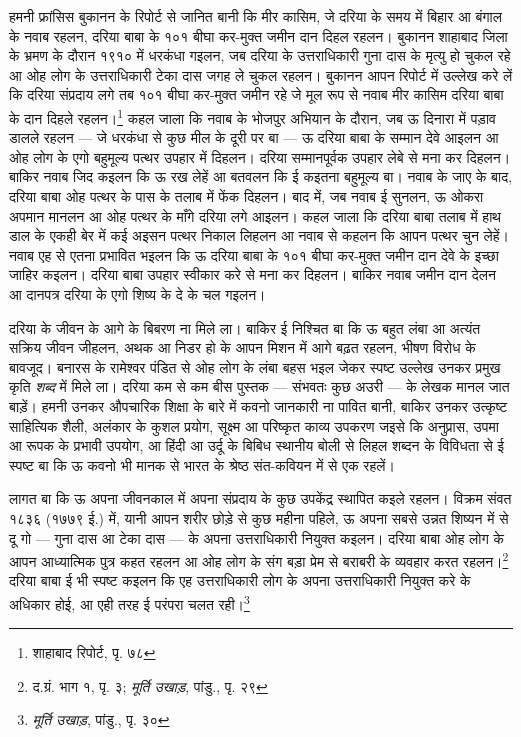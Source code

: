 हमनी फ्रांसिस बुकानन के रिपोर्ट से जानित बानी कि मीर कासिम, जे दरिया के समय में बिहार आ बंगाल के नवाब रहलन, दरिया बाबा के १०१ बीघा कर-मुक्त जमीन दान दिहल रहलन। बुकानन शाहाबाद जिला के भ्रमण के दौरान १९१० में धरकंधा गइलन, जब दरिया के उत्तराधिकारी गुना दास के मृत्यु हो चुकल रहे आ ओह लोग के उत्तराधिकारी टेका दास जगह ले चुकल रहलन। बुकानन आपन रिपोर्ट में उल्लेख करे लें कि दरिया संप्रदाय लगे तब १०१ बीघा कर-मुक्त जमीन रहे जे मूल रूप से नवाब मीर कासिम दरिया बाबा के दान दिहले रहलन।\footnote{शाहाबाद रिपोर्ट, पृ. ७८} कहल जाला कि नवाब के भोजपुर अभियान के दौरान, जब ऊ दिनारा में पड़ाव डालले रहलन — जे धरकंधा से कुछ मील के दूरी पर बा — ऊ दरिया बाबा के सम्मान देवे आइलन आ ओह लोग के एगो बहुमूल्य पत्थर उपहार में दिहलन। दरिया सम्मानपूर्वक उपहार लेबे से मना कर दिहलन। बाकिर नवाब जिद कइलन कि ऊ रख लेहें आ बतवलन कि ई कइतना बहुमूल्य बा। नवाब के जाए के बाद, दरिया बाबा ओह पत्थर के पास के तलाब में फेंक दिहलन। बाद में, जब नवाब ई सुनलन, ऊ ओकरा अपमान मानलन आ ओह पत्थर के माँगे दरिया लगे आइलन। कहल जाला कि दरिया बाबा तलाब में हाथ डाल के एकही बेर में कई अइसन पत्थर निकाल लिहलन आ नवाब से कहलन कि आपन पत्थर चुन लेहें। नवाब एह से एतना प्रभावित भइलन कि ऊ दरिया बाबा के १०१ बीघा कर-मुक्त जमीन दान देवे के इच्छा जाहिर कइलन। दरिया बाबा उपहार स्वीकार करे से मना कर दिहलन। बाकिर नवाब जमीन दान देलन आ दानपत्र दरिया के एगो शिष्य के दे के चल गइलन।

दरिया के जीवन के आगे के बिबरण ना मिले ला। बाकिर ई निश्चित बा कि ऊ बहुत लंबा आ अत्यंत सक्रिय जीवन जीहलन, अथक आ निडर हो के आपन मिशन में आगे बढ़त रहलन, भीषण विरोध के बावजूद। बनारस के रामेश्वर पंडित से ओह लोग के लंबा बहस भइल जेकर स्पष्ट उल्लेख उनकर प्रमुख कृति \textit{शब्द} में मिले ला। दरिया कम से कम बीस पुस्तक — संभवतः कुछ अउरी — के लेखक मानल जात बाड़ें। हमनी उनकर औपचारिक शिक्षा के बारे में कवनो जानकारी ना पावित बानी, बाकिर उनकर उत्कृष्ट साहित्यिक शैली, अलंकार के कुशल प्रयोग, सूक्ष्म आ परिष्कृत काव्य उपकरण जइसे कि अनुप्रास, उपमा आ रूपक के प्रभावी उपयोग, आ हिंदी आ उर्दू के बिबिध स्थानीय बोली से लिहल शब्दन के विविधता से ई स्पष्ट बा कि ऊ कवनो भी मानक से भारत के श्रेष्ठ संत-कवियन में से एक रहलें।

लागत बा कि ऊ अपना जीवनकाल में अपना संप्रदाय के कुछ उपकेंद्र स्थापित कइले रहलन। विक्रम संवत १८३६ (१७७९ ई.) में, यानी आपन शरीर छोड़े से कुछ महीना पहिले, ऊ अपना सबसे उन्नत शिष्यन में से दू गो — गुना दास आ टेका दास — के अपना उत्तराधिकारी नियुक्त कइलन। दरिया बाबा ओह लोग के आपन आध्यात्मिक पुत्र कहत रहलन आ ओह लोग के संग बड़ा प्रेम से बराबरी के व्यवहार करत रहलन।\footnote{द.ग्रं. भाग १, पृ. ३; \textit{मूर्ति उखाड़}, पांडु., पृ. २९} दरिया बाबा ई भी स्पष्ट कइलन कि एह उत्तराधिकारी लोग के अपना उत्तराधिकारी नियुक्त करे के अधिकार होई, आ एही तरह ई परंपरा चलत रही।\footnote{\textit{मूर्ति उखाड़}, पांडु., पृ. ३०}


